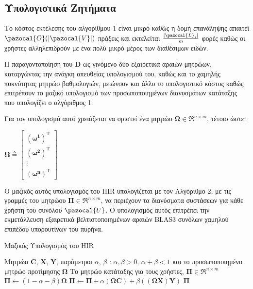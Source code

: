 \subsection{Υπολογιστικά Ζητήματα}
Το κόστος εκτέλεσης του αλγορίθμου 1 είναι μικρό καθώς η δομή επανάληψης απαιτεί $\pazocal{O}(|\pazocal{V}|)$ πράξεις και εκτελείται $\frac{|\pazocal{L}_i|}{m}$ φορές καθώς οι χρήστες αλληλεπιδρούν με ένα πολύ μικρό μέρος των διαθέσιμων ειδών.\par
Η παραγοντοποίηση του $\mathbf{D}$ ως γινόμενο δύο εξαιρετικά αραιών μητρώων, καταργώντας την ανάγκη απευθείας υπολογισμού του, καθώς και το χαμηλής πυκνότητας μητρώο βαθμολογιών, μειώνουν και άλλο το υπολογιστικό κόστος καθώς επιτρέπουν το μαζικό υπολογισμό των προσωποποιημένων διανυσμάτων κατάταξης που υπολογίζει ο αλγόριθμος 1. \par
Για τον υπολογισμό αυτό χρειάζεται να οριστεί ένα μητρώο $\boldsymbol{\Omega}\in\Re^{n\times m}$, τέτοιο ώστε: 
\begin{center}
$\boldsymbol{\Omega} \triangleq \left[     
\begin{array}{c}
\boldsymbol{(\omega^1)}^\text{T} \\
\boldsymbol{(\omega^2)}^\text{T} \\
\vdots \\ 
\boldsymbol{(\omega^n)}^\text{T}
\end{array}\right]$ 
\end{center}\par
Ο μαζικός αυτός υπολογισμός του {\en HIR} υπολογίζεται με τον Αλγόριθμο 2, με τις γραμμές του μητρώου $\boldsymbol{\Pi}\in \Re^{n\times m}$, να περιέχουν τα διανύσματα συστάσεων για κάθε χρήστη του συνόλου $\pazocal{U}$. Ο υπολογισμός αυτός επιτρέπει την εκμετάλλευση εξαιρετικά βελτιστοποιημένων αραιών {\en BLAS3} συνόλων χαμηλού επιπέδου υπορουτίνων του πυρήνα.
\begin{algorithm}[ht]
  \caption{Μαζικός Υπολογισμός του {\en HIR}}\label{}
  \begin{algorithmic}[1]
    \Require Μητρώα $\mathbf{C}$, $\mathbf{X}$, $\mathbf{Y}$, παράμετροι $\alpha$, $\beta$ : $\alpha, \beta > 0$, $\alpha + \beta < 1$ και το προσωποποιημένο μητρώο προτίμησης $\boldsymbol{\Omega}$
    \Ensure Το μητρώο κατάταξης για τους χρήστες, $\boldsymbol{\Pi}\in \Re^{n\times m}$
    \medskip
    \State $\boldsymbol{\Pi} \gets (1-\alpha - \beta)\boldsymbol{\Omega}$
    \State $\boldsymbol{\Pi} \gets \boldsymbol{\Pi} + \alpha(\boldsymbol{\Omega}\mathbf{C}) + \beta((\boldsymbol{\Omega}\mathbf{X})\mathbf{Y})$
    \State \Return $ \boldsymbol{\Pi} $
  \end{algorithmic}
\end{algorithm}
